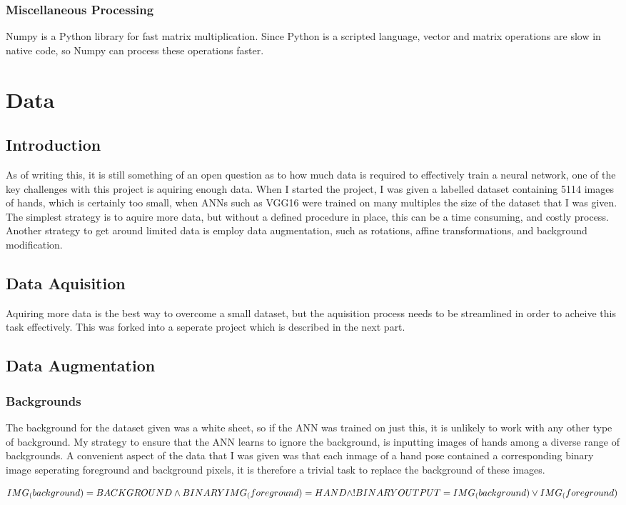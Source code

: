             \subsubsection{Miscellaneous Processing}
            Numpy is a Python library for fast matrix multiplication. Since Python is a scripted language, vector and matrix operations are slow in native code, so Numpy can process these operations faster.

    \section{Data}
        \subsection{Introduction}
        As of writing this, it is still something of an open question as to how much data is required to effectively train a neural network, one of the key challenges with this project is aquiring enough data. When I started the project, I was given a labelled dataset containing 5114 images of hands, which is certainly too small, when ANNs such as VGG16 \cite{vggnet} were trained on many multiples the size of the dataset that I was given. The simplest strategy is to aquire more data, but without a defined procedure in place, this can be a time consuming, and costly process. Another strategy to get around limited data is employ data augmentation, such as rotations, affine transformations, and background modification.

        \subsection{Data Aquisition}
        Aquiring more data is the best way to overcome a small dataset, but the aquisition process needs to be streamlined in order to acheive this task effectively. This was forked into a seperate project which is described in the next part.

        \subsection{Data Augmentation}
            \subsubsection{Backgrounds}
            The background for the dataset given was a white sheet, so if the ANN was trained on just this, it is unlikely to work with any other type of background. My strategy to ensure that the ANN learns to ignore the background, is inputting images of hands among a diverse range of backgrounds. A convenient aspect of the data that I was given was that each inmage of a hand pose contained a corresponding binary image seperating foreground and background pixels, it is therefore a trivial task to replace the background of these images.

            \[
                IMG_(background) = BACKGROUND \land BINARY\\
                IMG_(foreground) = HAND \land!BINARY\\
                OUTPUT = IMG_(background) \lor IMG_(foreground)\\
            \]
